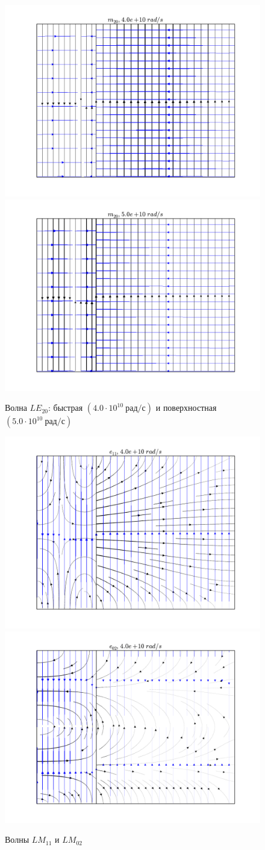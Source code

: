 \begin{figure}[h]
\center
\includegraphics[width=.47\textwidth]{field/field_le_2_0_4,0e+10.png}\hfill
\includegraphics[width=.47\textwidth]{field/field_le_2_0_5,0e+10.png}
\caption{Волна \(LE_{20}\): быстрая \((4.0\cdot10^{10}~\text{рад/с})\) и
поверхностная \((5.0\cdot10^{10}~\text{рад/с})\)}
\end{figure}
\begin{figure}[h]
\center
\includegraphics[width=.47\textwidth]{field/field_lm_1_1_4,0e+10.png}\hfill
\includegraphics[width=.47\textwidth]{field/field_lm_0_2_4,0e+10.png}
\caption{Волны \(LM_{11}\) и \(LM_{02}\)}
\end{figure}
